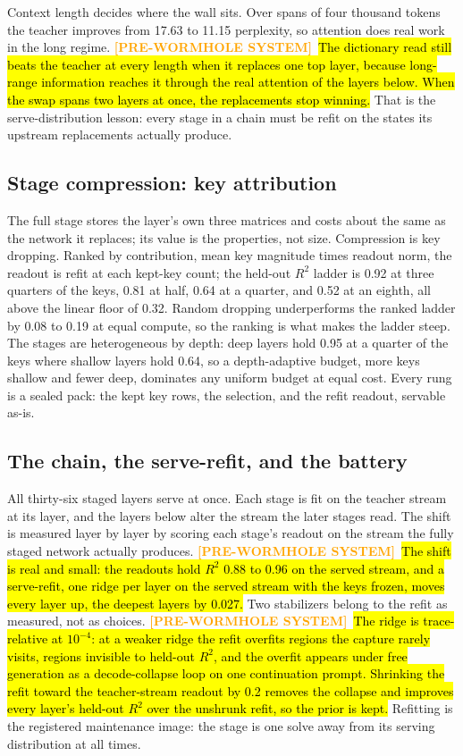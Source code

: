 \documentclass[11pt]{article}
\newcommand{\oldsystem}[1]{%
  {\sethlcolor{orange!25}\textcolor{orange}{\textbf{[PRE-WORMHOLE SYSTEM]}}~\hl{#1}}%
  \sethlcolor{yellow}}
\begin{document}
Context length decides where the wall sits. Over spans of four
thousand tokens the teacher improves from 17.63 to 11.15
perplexity, so attention does real work in the long regime. \oldsystem{The
dictionary read still beats the teacher at every length when it
replaces one top layer, because long-range information reaches it
through the real attention of the layers below. When the swap spans
two layers at once, the replacements stop winning.} That is the
serve-distribution lesson: every stage in a chain must be refit on
the states its upstream replacements actually produce.

\subsection{Stage compression: key attribution}

The full stage stores the layer's own three matrices and costs
about the same as the network it replaces; its value is the
properties, not size. Compression is key dropping. Ranked by
contribution, mean key magnitude times readout norm, the readout
is refit at each kept-key count; the held-out $R^2$ ladder is 0.92
at three quarters of the keys, 0.81 at half, 0.64 at a quarter,
and 0.52 at an eighth, all above the linear floor of 0.32. Random
dropping underperforms the ranked ladder by 0.08 to 0.19 at equal
compute, so the ranking is what makes the ladder steep. The
stages are heterogeneous by depth: deep layers hold 0.95 at a
quarter of the keys where shallow layers hold 0.64, so a
depth-adaptive budget, more keys shallow and fewer deep,
dominates any uniform budget at equal cost. Every rung is a
sealed pack: the kept key rows, the selection, and the refit
readout, servable as-is.

\subsection{The chain, the serve-refit, and the battery}

All thirty-six staged layers serve at once. Each stage is fit on
the teacher stream at its layer, and the layers below alter the
stream the later stages read. The shift is measured layer by layer
by scoring each stage's readout on the stream the fully staged
network actually produces. \oldsystem{The shift is real and small: the
readouts hold $R^2$ 0.88 to 0.96 on the served stream, and a
serve-refit, one ridge per layer on the served stream with the
keys frozen, moves every layer up, the deepest layers by 0.027.}
Two stabilizers belong to the refit as measured, not as choices.
\oldsystem{The ridge is trace-relative at $10^{-4}$: at a weaker ridge the
refit overfits regions the capture rarely visits, regions
invisible to held-out $R^2$, and the overfit appears under free
generation as a decode-collapse loop on one continuation prompt.
Shrinking the refit toward the teacher-stream readout by 0.2
removes the collapse and improves every layer's held-out $R^2$
over the unshrunk refit, so the prior is kept.} Refitting is the
registered maintenance image: the stage is one solve away from
its serving distribution at all times.
\end{document}
